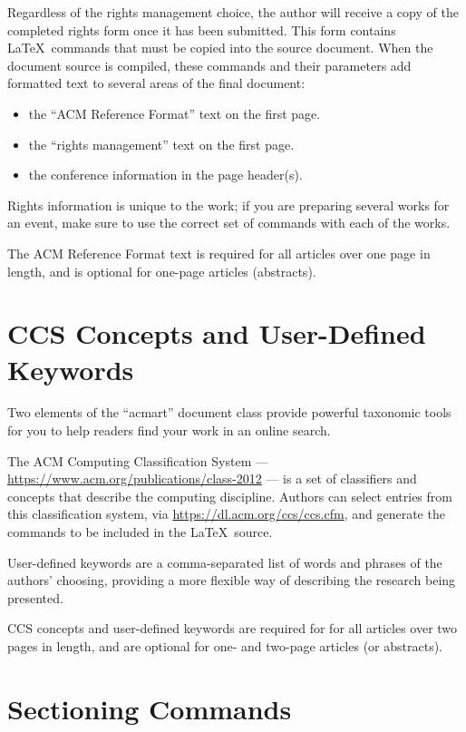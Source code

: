 \documentclass[sigconf,authordraft]{acmart}
\begin{document}
Regardless of the rights management choice, the author will receive a
copy of the completed rights form once it has been submitted. This
form contains \LaTeX\ commands that must be copied into the source
document. When the document source is compiled, these commands and
their parameters add formatted text to several areas of the final
document:
\begin{itemize}
\item the ``ACM Reference Format'' text on the first page.
\item the ``rights management'' text on the first page.
\item the conference information in the page header(s).
\end{itemize}

Rights information is unique to the work; if you are preparing several
works for an event, make sure to use the correct set of commands with
each of the works.

The ACM Reference Format text is required for all articles over one
page in length, and is optional for one-page articles (abstracts).

\section{CCS Concepts and User-Defined Keywords}

Two elements of the ``acmart'' document class provide powerful
taxonomic tools for you to help readers find your work in an online
search.

The ACM Computing Classification System ---
\url{https://www.acm.org/publications/class-2012} --- is a set of
classifiers and concepts that describe the computing
discipline. Authors can select entries from this classification
system, via \url{https://dl.acm.org/ccs/ccs.cfm}, and generate the
commands to be included in the \LaTeX\ source.

User-defined keywords are a comma-separated list of words and phrases
of the authors' choosing, providing a more flexible way of describing
the research being presented.

CCS concepts and user-defined keywords are required for for all
articles over two pages in length, and are optional for one- and
two-page articles (or abstracts).

\section{Sectioning Commands}
\end{document}
